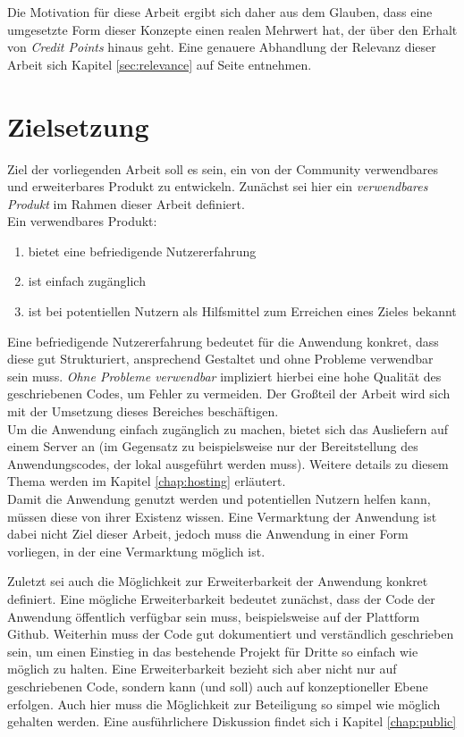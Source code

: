 Die Motivation für diese Arbeit ergibt sich daher aus dem Glauben, dass eine umgesetzte Form dieser Konzepte einen realen Mehrwert hat, der über den Erhalt von \textit{Credit Points} hinaus geht.
Eine genauere Abhandlung der Relevanz dieser Arbeit sich Kapitel \ref{sec:relevance} auf Seite entnehmen.

\section{Zielsetzung}
\label{chap:goal}
Ziel der vorliegenden Arbeit soll es sein, ein von der Community verwendbares und erweiterbares Produkt zu entwickeln. Zunächst sei hier ein \textit{verwendbares Produkt} im Rahmen dieser Arbeit definiert.\\
Ein verwendbares Produkt:

\begin{enumerate}
  \item bietet eine befriedigende Nutzererfahrung
  \item ist einfach zugänglich
  \item ist bei potentiellen Nutzern als Hilfsmittel zum Erreichen eines Zieles bekannt
\end{enumerate}

Eine befriedigende Nutzererfahrung bedeutet für die Anwendung konkret, dass diese gut Strukturiert, ansprechend Gestaltet und ohne Probleme verwendbar sein muss. \textit{Ohne Probleme verwendbar} impliziert hierbei eine hohe Qualität des geschriebenen Codes, um Fehler zu vermeiden. Der Großteil der Arbeit wird sich mit der Umsetzung dieses Bereiches beschäftigen.\\
Um die Anwendung einfach zugänglich zu machen, bietet sich das Ausliefern auf einem Server an (im Gegensatz zu beispielsweise nur der Bereitstellung des Anwendungscodes, der lokal ausgeführt werden muss). Weitere details zu diesem Thema werden im Kapitel \ref{chap:hosting} erläutert.\\
Damit die Anwendung genutzt werden und potentiellen Nutzern helfen kann, müssen diese von ihrer Existenz wissen. Eine Vermarktung der Anwendung ist dabei nicht Ziel dieser Arbeit, jedoch muss die Anwendung in einer Form vorliegen, in der eine Vermarktung möglich ist.

Zuletzt sei auch die Möglichkeit zur Erweiterbarkeit der Anwendung konkret definiert. Eine mögliche Erweiterbarkeit bedeutet zunächst, dass der Code der Anwendung öffentlich verfügbar sein muss, beispielsweise auf der Plattform Github\footnotemark{}. Weiterhin muss der Code gut dokumentiert und verständlich geschrieben sein, um einen Einstieg in das bestehende Projekt für Dritte so einfach wie möglich zu halten. Eine Erweiterbarkeit bezieht sich aber nicht nur auf geschriebenen Code, sondern kann (und soll) auch auf konzeptioneller Ebene erfolgen. Auch hier muss die Möglichkeit zur Beteiligung so simpel wie möglich gehalten werden. Eine ausführlichere Diskussion findet sich i Kapitel \ref{chap:public}\\

